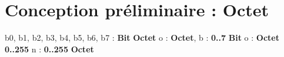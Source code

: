\section{Conception préliminaire : Octet}

\begin{algorithme}
    {b0, b1, b2, b3, b4, b5, b6, b7 : \textbf{Bit}}
    {\textbf{Octet}}
    {}
    {o : \textbf{Octet}, b : \textbf{0..7}}
    {\textbf{Bit}}
    {}
    {o : \textbf{Octet}}
    {\textbf{0..255}}
    {}
    {n : \textbf{0..255}}
    {\textbf{Octet}}
    {}
\end{algorithme}